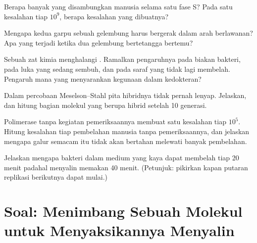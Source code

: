 \begin{exercise}[$\star\star$]\label{exo:g11:dna-replication:10}
Berapa banyak  yang disambungkan  manusia selama satu fase
S? Pada satu kesalahan tiap $10^9$, berapa kesalahan yang dibuatnya?
\end{exercise}

\begin{exercise}[$\star\star$]\label{exo:g11:dna-replication:11}
Mengapa kedua garpu sebuah gelembung harus bergerak dalam arah
berlawanan? Apa yang terjadi ketika dua gelembung bertetangga bertemu?
\end{exercise}

\begin{exercise}[$\star\star\star$]\label{exo:g11:dna-replication:12}
Sebuah zat kimia menghalangi . Ramalkan pengaruhnya pada
biakan bakteri, pada luka yang sedang sembuh, dan pada  saraf yang
tidak lagi membelah. Pengaruh mana yang menyarankan kegunaan dalam kedokteran?
\end{exercise}

\begin{exercise}[$\star\star\star$]\label{exo:g11:dna-replication:13}
Dalam percobaan Meselson--Stahl pita hibridnya tidak pernah lenyap.
Jelaskan, dan hitung bagian molekul yang berupa hibrid setelah
10 generasi.
\end{exercise}

\begin{exercise}[$\star\star\star$]\label{exo:g11:dna-replication:14}
Polimerase tanpa kegiatan pemeriksaannya membuat satu kesalahan tiap
$10^5$. Hitung kesalahan tiap pembelahan  manusia tanpa
pemeriksaannya, dan jelaskan mengapa galur  semacam itu tidak akan
bertahan melewati banyak pembelahan.
\end{exercise}

\begin{exercise}[$\star\star\star$]\label{exo:g11:dna-replication:15}
Jelaskan mengapa bakteri dalam medium yang kaya dapat membelah tiap 20
menit padahal menyalin  memakan 40 menit. (Petunjuk:
pikirkan kapan putaran replikasi berikutnya dapat mulai.)
\end{exercise}

\section{Soal: Menimbang Sebuah Molekul untuk Menyaksikannya Menyalin}

